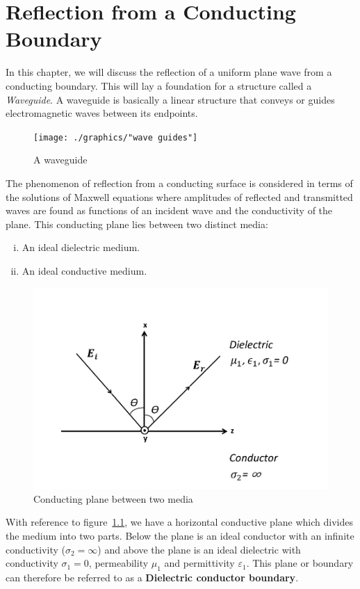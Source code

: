\chapter{Reflection from a Conducting Boundary}\label{lec:lec34}
In this chapter, we will discuss the reflection of a uniform plane wave from a conducting boundary. This will lay a foundation for a structure called a \emph{Waveguide}. A waveguide is basically a linear structure that conveys or guides electromagnetic waves between its endpoints.
\begin{figure}[h]
\centering
\texttt{[image: ./graphics/"wave guides"]}
\caption{A waveguide}
\end{figure}

The phenomenon of reflection from a conducting surface is considered in terms of the solutions of Maxwell equations where amplitudes of reflected and transmitted waves are found as functions of an incident wave and the conductivity of the plane. This conducting plane lies between two distinct media: 
\begin{enumerate}[(i)]
\item An ideal dielectric medium.
\item An ideal conductive medium.
\end{enumerate}
\begin{figure}[h]
\centering
\includegraphics[width=1\linewidth]{./graphics/dielectric_conductor_boundary}
\caption{Conducting plane between two media}
\label{fig:plane}
\end{figure}

With reference to figure~\ref{fig:plane}, we have a horizontal conductive plane which divides the medium into two parts. Below the plane is an ideal conductor with an infinite conductivity ($\sigma _2 =\infty$) and above the plane is an ideal dielectric with conductivity $\sigma_1 = 0$, permeability $\mu _1$ and	permittivity $ \varepsilon _1$. This plane or boundary can therefore be referred to as a \textbf{Dielectric conductor boundary}.

